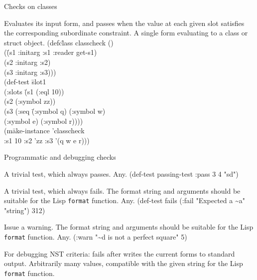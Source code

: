 \begin{criteriaGroup}{Checks on classes}{}

{Evaluates its input form, and passes when the value at each given
slot satisfies the corresponding subordinate constraint.}
{A single form evaluating to a class or struct object.}
{}
{\tabbingEx}{
(defc\=lass classcheck ()
\\ \> (\=(s1 :initarg :s1 :reader get-s1)
\\ \> \> (s2 :initarg :s2)
\\ \> \> (s3 :initarg :s3)))
\\ (def-test \=slot1
\\ \>  (:slots \=(s1 (:eql 10))
\\ \>  \>(s2 (:symbol zz))
\\ \>  \>(s3 (:seq \=(:symbol q) (:symbol w)
\\ \>  \> \> (:symbol e) (:symbol r))))
\\ \>  (m\=ake-instance 'classcheck
\\ \> \>  :s1 10 :s2 'zz :s3 '(q w e r)))
}

\end{criteriaGroup}

\begin{criteriaGroup}{Programmatic and debugging checks}{}

{A trivial test, which always passes.}
{Any.}
{\noExpl}
{\singleEx}{(def-test passing-test :pass 3 4 "sd")}

{A trivial test, which always fails.  The format string and arguments
should be suitable for the Lisp \texttt{format} function.}
{Any.}
{\noExpl}
{\singleEx}{(def-test fails (:fail "Expected a \~{}a" "string") 312)}

{Issue a warning.  The format string and arguments should be suitable for
 the Lisp \texttt{format} function.}
{Any.}
{\noExpl}
{\singleEx}{(:warn "\~{}d is not a perfect square" 5)}

{For debugging NST criteria: fails after writes the current forms to
standard output.}
{Arbitrarily many values, compatible with the given string for the
Lisp \texttt{format} function.}
{\noExpl}{\noEx}{}

\end{criteriaGroup}

